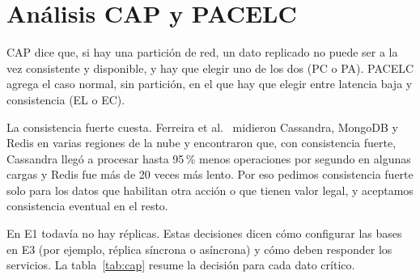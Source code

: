 \section{Análisis CAP y PACELC}\label{sec:cap}

CAP dice que, si hay una partición de red, un dato replicado no puede ser a la vez consistente y disponible, y hay que elegir uno de los dos (PC o PA). PACELC agrega el caso normal, sin partición, en el que hay que elegir entre latencia baja y consistencia (EL o EC).

La consistencia fuerte cuesta. Ferreira et al.~\cite{ferreira2025benchmarking} midieron Cassandra, MongoDB y Redis en varias regiones de la nube y encontraron que, con consistencia fuerte, Cassandra llegó a procesar hasta 95\,\% menos operaciones por segundo en algunas cargas y Redis fue más de 20 veces más lento. Por eso pedimos consistencia fuerte solo para los datos que habilitan otra acción o que tienen valor legal, y aceptamos consistencia eventual en el resto.

En E1 todavía no hay réplicas. Estas decisiones dicen cómo configurar las bases en E3 (por ejemplo, réplica síncrona o asíncrona) y cómo deben responder los servicios. La tabla~\ref{tab:cap} resume la decisión para cada dato crítico.

